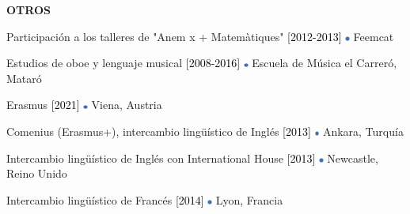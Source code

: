 \documentclass[../main.tex]{subfiles}
\begin{document}
    \vspace*{0.8cm}
    \textbf{\textcolor{myCV2}{OTROS\underline{\hspace{16.75cm}}}}
        \vspace*{0.3cm}
        
        Participación a los talleres de "Anem x + Matemàtiques"
        \textcolor{black}{[2012-2013]}
        \includegraphics[width=0.15cm]{assets/blue.png} 
        Feemcat

        \vspace*{0.25cm}
        Estudios de oboe y lenguaje musical
        \textcolor{black}{[2008-2016]}
        \includegraphics[width=0.15cm]{assets/blue.png} 
        Escuela de Música el Carreró, Mataró

        \vspace*{0.25cm}
        Erasmus
        \textcolor{black}{[2021]}
        \includegraphics[width=0.15cm]{assets/blue.png} 
        Viena, Austria
        
        \vspace*{0.25cm}
        Comenius (Erasmus+), intercambio lingüístico de Inglés
        \textcolor{black}{[2013]}
        \includegraphics[width=0.15cm]{assets/blue.png} 
        Ankara, Turquía

        \vspace*{0.25cm}
        Intercambio lingüístico de Inglés con International House
        \textcolor{black}{[2013]}
        \includegraphics[width=0.15cm]{assets/blue.png} 
        Newcastle, Reino Unido

        \vspace*{0.25cm}
        Intercambio lingüístico de Francés
        \textcolor{black}{[2014]}
        \includegraphics[width=0.15cm]{assets/blue.png} 
        Lyon, Francia
        
\end{document}
